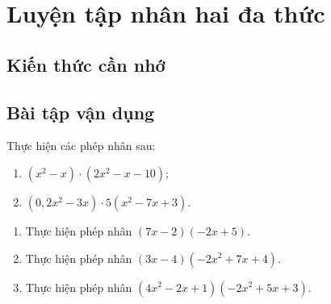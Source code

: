 \section{Luyện tập nhân hai đa thức}
\subsection{Kiến thức cần nhớ}

\subsection{Bài tập vận dụng}
\begin{bt}
 Thực hiện các phép nhân sau:
	\begin{enumerate}
		\item $\left(x^2-x\right) \cdot\left(2x^2-x-10\right)$;
		\item $\left(0,2x^2-3x\right) \cdot 5\left(x^2-7x+3\right)$.
	\end{enumerate}
	\loigiai{}
\end{bt}

\begin{bt}
	\begin{enumerate}
		\item Thực hiện phép nhân $(7x-2)(-2x+5)$.
		\item Thực hiện phép nhân $(3x-4)\left(-2x^2+7x+4\right)$.
		\item Thực hiện phép nhân $\left(4x^2-2x+1\right)\left(-2x^2+5x+3\right)$.
	\end{enumerate}
	\loigiai{}
\end{bt}
